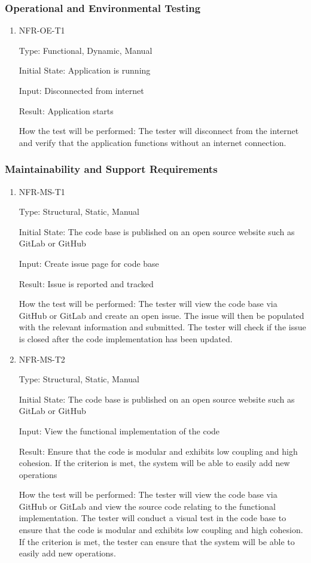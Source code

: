 \documentclass[12pt, titlepage]{article}
\begin{document}
\subsubsection{Operational and Environmental Testing}
\begin{enumerate}

\item{NFR-OE-T1\\}

Type: Functional, Dynamic, Manual
					
Initial State: Application is running
					
Input: Disconnected from internet
					
Result: Application starts

How the test will be performed: The tester will disconnect from the internet and verify that the application functions without an internet connection. 
\end{enumerate}

\subsubsection{Maintainability and Support Requirements}
\begin{enumerate}
\item{NFR-MS-T1\\}

Type: Structural, Static, Manual

Initial State: The code base is published on an open source website such as GitLab or GitHub
					
Input: Create issue page for code base
					
Result: Issue is reported and tracked

How the test will be performed: The tester will view the code base via GitHub or GitLab and create an open issue. The issue will then be populated with the relevant information and submitted. The tester will check if the issue is closed after the code implementation has been updated. 

\item{NFR-MS-T2\\}

Type: Structural, Static, Manual

Initial State: The code base is published on an open source website such as GitLab or GitHub
					
Input: View the functional implementation of the code
					
Result: Ensure that the code is modular and exhibits low coupling and high cohesion. If the criterion is met, the system will be able to easily add new operations

How the test will be performed: The tester will view the code base via GitHub or GitLab and view the source code relating to the functional implementation. The tester will conduct a visual test in the code base to ensure that the code is modular and exhibits low coupling and high cohesion. If the criterion is met, the tester can ensure that the system will be able to easily add new operations.
\end{enumerate}
\end{document}
